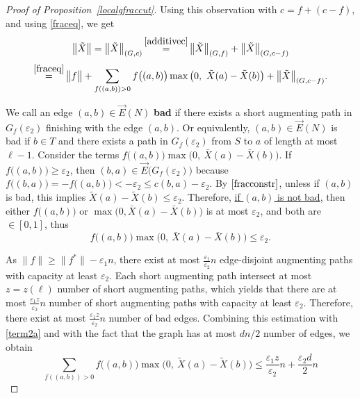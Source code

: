 \documentclass[12pt,a4paper]{article}
\newcommand{\eps}{\varepsilon}
\newcommand{\vE}{\vec{E}}
\renewcommand{\:}{\colon}
\begin{document}
\begin{proof}[Proof of Proposition~\ref{localgfraccut}]
Using this observation with $c = f + (c - f)$, and using \eqref{fraceq}, we get
\begin{equation*}
\big\|\tilde{X}\big\| = \big\|\tilde{X}\big\|_{(G, c)} \mathop{=}^{\eqref{additivec}} \big\|\tilde{X}\big\|_{(G, f)} + \big\|\tilde{X}\big\|_{(G, c - f)}
\end{equation*}
\begin{equation} \label{threeterms}
\mathop{=}^{\eqref{fraceq}} \big\|f\big\| + \sum_{f((a, b)) > 0} f\big((a, b)\big) \max\big(0,\ \tilde{X}(a) - \tilde{X}(b)\big) + \big\|\tilde{X}\big\|_{(G, c - f)}.
\end{equation}

We call an edge $(a, b) \in \vE(N)$ \textbf{bad} if there exists a short augmenting path in $G_f(\eps_2)$ finishing with the edge $(a, b)$. 
Or equivalently, $(a, b) \in \vE(N)$ is bad if $b \in T$ and there exists a path in $G_f(\eps_2)$ from $S$ to $a$ of length at most $\ell - 1$. 
Consider the terms $f\big((a, b)\big) \max \big( 0,\ \bar{X}(a) - \bar{X}(b) \big)$. If $f\big((a, b)\big) \ge \eps_2$, then $(b, a) \in \vE\big(G_f(\eps_2)\big)$ because $f\big((b, a)\big) = - f\big((a, b)\big) < - \eps_2 \le c(b, a) - \eps_2$.
By $\eqref{fracconstr}$, unless if $(a, b)$ is bad, this implies $\tilde{X}(a) - \tilde{X}(b) \le \eps_2$. 
Therefore, \underline{if $(a, b)$ is not bad}, then either $f\big((a, b)\big)$ or $\max \big( 0, \bar{X}(a) - \bar{X}(b) \big)$ is at most $\eps_2$, and both are $\in [0, 1]$, thus
\begin{equation} \label{term2a}
f\big((a, b)\big) \max \big( 0,\ \bar{X}(a) - \bar{X}(b) \big) \le \eps_2.
\end{equation}

As $\|f\| \ge \|f^*\| - \eps_1 n$, there exist at most $\frac{\eps_1}{\eps_2} n$ edge-disjoint augmenting paths with capacity at least $\eps_2$. 
Each short augmenting path intersect at most $z = z(\ell)$ number of short augmenting paths, which yields that there are at most $\frac{\eps_1 z}{\eps_2} n$ number of short augmenting paths with capacity at least $\eps_2$. 
Therefore, there exist at most $\frac{\eps_1 z}{\eps_2} n$ number of bad edges. 
Combining this estimation with \eqref{term2a} and with the fact that the graph has at most $dn / 2$ number of edges, we obtain
\begin{equation} \label{term2}
\sum_{f((a, b)) > 0} f\big((a, b)\big) \max\big(0,\ \tilde{X}(a) - \tilde{X}(b)\big) \le \frac{\eps_1 z}{\eps_2} n + \frac{\eps_2 d}{2} n
\end{equation}


\end{proof}
\end{document}
